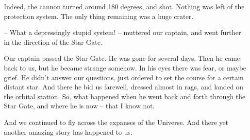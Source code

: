\documentclass[ebook,twoside,final,openright]{memoir}
\begin{document}
Indeed, the cannon turned around 180 degrees, and shot. Nothing was left of the protection system. The only thing remaining was a huge crater.\par
– What a depressingly stupid system! – muttered our captain, and went further in the direction of the Star Gate.\par
\par
Our captain passed the Star Gate. He was gone for several days. Then he came back to us, but he became strange somehow. In his eyes there was fear, or maybe grief. He didn’t answer our questions, just ordered to set the course for a certain distant star. And there he bid us farewell, dressed almost in rags, and landed on the orbital station. So, what happened when he went back and forth through the Star Gate, and where he is now – that I know not. \par
\par
 And we continued to fly across the expanses of the Universe. And there yet another amazing story has happened to us.
\end{document}
